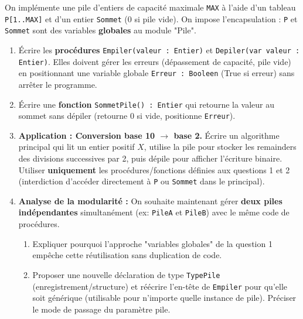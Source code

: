 \documentclass[11pt]{article}
\begin{document}
\begin{exercice}
On implémente une pile d'entiers de capacité maximale \texttt{MAX} à l'aide d'un tableau \texttt{P[1..MAX]} et d'un entier \texttt{Sommet} (0 si pile vide). On impose l'encapsulation : \texttt{P} et \texttt{Sommet} sont des variables \textbf{globales} au module "Pile".
\begin{enumerate}
    \item Écrire les \textbf{procédures} \texttt{Empiler(valeur : Entier)} et \texttt{Depiler(var valeur : Entier)}. Elles doivent gérer les erreurs (dépassement de capacité, pile vide) en positionnant une variable globale \texttt{Erreur : Booleen} (True si erreur) sans arrêter le programme.
    \item Écrire une \textbf{fonction} \texttt{SommetPile() : Entier} qui retourne la valeur au sommet sans dépiler (retourne 0 si vide, positionne \texttt{Erreur}).
    \item \textbf{Application : Conversion base 10 $\to$ base 2.} Écrire un algorithme principal qui lit un entier positif $X$, utilise la pile pour stocker les remainders des divisions successives par 2, puis dépile pour afficher l'écriture binaire. Utiliser \textbf{uniquement} les procédures/fonctions définies aux questions 1 et 2 (interdiction d'accéder directement à \texttt{P} ou \texttt{Sommet} dans le principal).
    \item \textbf{Analyse de la modularité :} On souhaite maintenant gérer \textbf{deux piles indépendantes} simultanément (ex: \texttt{PileA} et \texttt{PileB}) avec le même code de procédures.
    \begin{enumerate}
        \item Expliquer pourquoi l'approche "variables globales" de la question 1 empêche cette réutilisation sans duplication de code.
        \item Proposer une nouvelle déclaration de type \texttt{TypePile} (enregistrement/structure) et réécrire l'en-tête de \texttt{Empiler} pour qu'elle soit générique (utilisable pour n'importe quelle instance de pile). Préciser le mode de passage du paramètre pile.
    \end{enumerate}
\end{enumerate}
\end{exercice}
\end{document}
